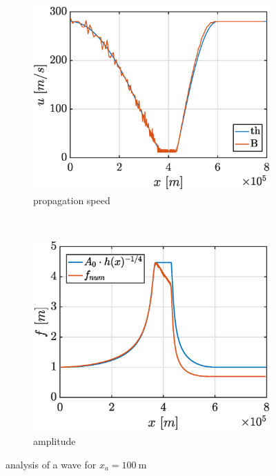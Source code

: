 \documentclass[a4paper,12pt,twoside]{article}
\begin{document}
      \begin{figure}[h]
        \centering
        \begin{subfigure}[t]{0.45\textwidth}
          \includegraphics[width=\textwidth]{graphs/xa100_tfin15000_u.eps}
          \caption{propagation speed}
          \label{fig:xa100_u}
        \end{subfigure}
        ~
        \begin{subfigure}[t]{0.45\textwidth}
          \includegraphics[width=\textwidth]{graphs/xa100_tfin15000_f.eps}
          \caption{amplitude}
          \label{fig:xa100_f}
        \end{subfigure}
        \caption{analysis of a wave for $x_a = \SI{100}{\meter}$}
        \label{fig:xa100}
      \end{figure}
\end{document}
